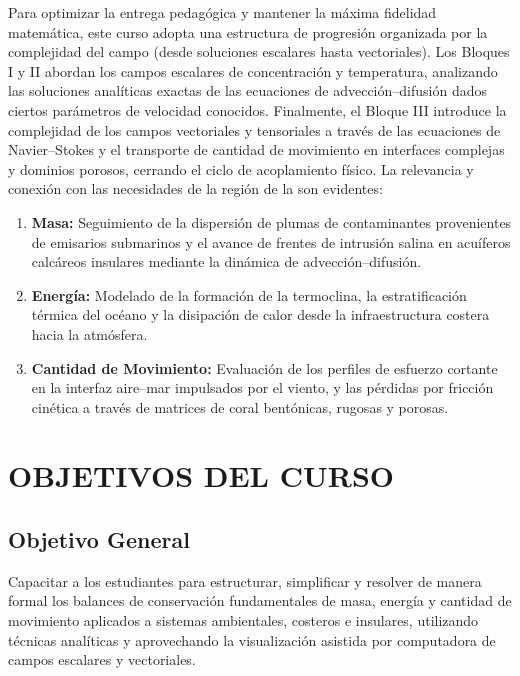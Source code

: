 Para optimizar la entrega pedagógica y mantener la máxima fidelidad matemática, este curso adopta una {estructura de progresión organizada por la complejidad del campo (desde soluciones escalares hasta vectoriales)}.  Los Bloques I y II abordan los campos escalares de concentración y temperatura, analizando las soluciones analíticas exactas de las ecuaciones de advección--difusión dados ciertos parámetros de velocidad conocidos. Finalmente, el Bloque III introduce la complejidad de los campos vectoriales y tensoriales a través de las ecuaciones de Navier--Stokes y el transporte de cantidad de movimiento en interfaces complejas y dominios porosos, cerrando el ciclo de acoplamiento físico.
La relevancia y conexión con las necesidades de la región de la \Region son evidentes:
\begin{enumerate}
    \item \textbf{Masa:} Seguimiento de la dispersión de plumas de contaminantes provenientes de emisarios submarinos y el avance de frentes de intrusión salina en acuíferos calcáreos insulares mediante la dinámica de advección--difusión.
\item \textbf{Energía:} Modelado de la formación de la termoclina, la estratificación térmica del océano y la disipación de calor desde la infraestructura costera hacia la atmósfera.
\item \textbf{Cantidad de Movimiento:} Evaluación de los perfiles de esfuerzo cortante en la interfaz aire--mar impulsados por el viento, y las pérdidas por fricción cinética a través de matrices de coral bentónicas, rugosas y porosas.
\end{enumerate}

\section{OBJETIVOS DEL CURSO}

\subsection{Objetivo General}
Capacitar a los estudiantes para estructurar, simplificar y resolver de manera formal los balances de conservación fundamentales de masa, energía y cantidad de movimiento aplicados a sistemas ambientales, costeros e insulares, utilizando técnicas analíticas y aprovechando la visualización asistida por computadora de campos escalares y vectoriales.
